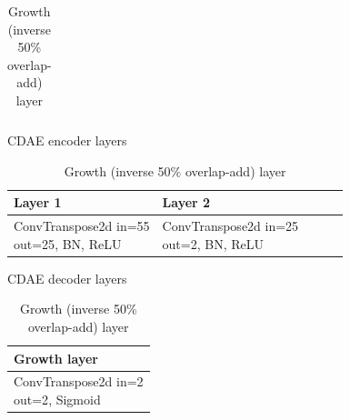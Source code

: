 \documentclass[report.tex]{subfiles}
\begin{document}
\begin{table}[ht]
\begin{tabular}{ |l|l|l|l|l| }
	 \hline
\end{tabular}
	\caption{CDAE encoder layers}
	\label{table:convtable3}
	\vspace{1em}
\begin{tabular}{ |l|l|l|l|l| }
	 \hline
		Layer 1 & Layer 2 \\
	 \hline
	 \hline
		ConvTranspose2d \makecell[l]{in=55\\out=25}, BN, ReLU & ConvTranspose2d \makecell[l]{in=25\\out=2}, BN, ReLU \\
	 \hline
\end{tabular}
	\caption{CDAE decoder layers}
	\label{table:convtable4}
	\vspace{1em}
\begin{tabular}{ |l| }
	 \hline
		Growth layer \\
	 \hline
	 \hline
		ConvTranspose2d \makecell[l]{in=2\\out=2}, Sigmoid \\
	 \hline
\end{tabular}
	\caption{Growth (inverse 50\% overlap-add) layer}
	\label{table:convtable5}
\end{table}
\end{document}
